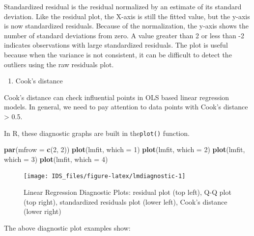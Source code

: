 \documentclass[12pt,]{krantz}
\makeatletter
\newenvironment{Shaded}{\begin{snugshade}}{\end{snugshade}}
\newcommand{\DataTypeTok}[1]{\textcolor[rgb]{0.27,0.27,0.27}{#1}}
\newcommand{\DecValTok}[1]{\textcolor[rgb]{0.06,0.06,0.06}{#1}}
\newcommand{\KeywordTok}[1]{\textcolor[rgb]{0.27,0.27,0.27}{\textbf{#1}}}
\newcommand{\NormalTok}[1]{#1}
\providecommand{\tightlist}{%
  \setlength{\itemsep}{0pt}\setlength{\parskip}{0pt}}
\newenvironment{kframe}{%
\medskip{}
\setlength{\fboxsep}{.8em}
 \def\at@end@of@kframe{}%
 \ifinner\ifhmode%
  \def\at@end@of@kframe{\end{minipage}}%
  \begin{minipage}{\columnwidth}%
 \fi\fi%
 \def\FrameCommand##1{\hskip\@totalleftmargin \hskip-\fboxsep
 \colorbox{shadecolor}{##1}\hskip-\fboxsep
     \hskip-\linewidth \hskip-\@totalleftmargin \hskip\columnwidth}%
 \MakeFramed {\advance\hsize-\width
   \@totalleftmargin\z@ \linewidth\hsize
   \@setminipage}}%
 {\par\unskip\endMakeFramed%
 \at@end@of@kframe}
\renewenvironment{Shaded}{\begin{kframe}}{\end{kframe}}
\makeatother
\begin{document}
Standardized residual is the residual normalized by an estimate of its standard deviation. Like the residual plot, the X-axis is still the fitted value, but the y-axis is now standardized residuals. Because of the normalization, the y-axis shows the number of standard deviations from zero. A value greater than 2 or less than -2 indicates observations with large standardized residuals. The plot is useful because when the variance is not consistent, it can be difficult to detect the outliers using the raw residuals plot.

\begin{enumerate}
\def\labelenumi{(\arabic{enumi})}
\setcounter{enumi}{3}
\tightlist
\item
  Cook's distance 
\end{enumerate}

Cook's distance can check influential points in OLS based linear regression models. In general, we need to pay attention to data points with Cook's distance \textgreater{} 0.5.

In R, these diagnostic graphs are built in the\texttt{plot()} function.

\begin{Shaded}
\begin{Highlighting}[]
\KeywordTok{par}\NormalTok{(}\DataTypeTok{mfrow =} \KeywordTok{c}\NormalTok{(}\DecValTok{2}\NormalTok{, }\DecValTok{2}\NormalTok{))}
\KeywordTok{plot}\NormalTok{(lmfit, }\DataTypeTok{which =} \DecValTok{1}\NormalTok{)}
\KeywordTok{plot}\NormalTok{(lmfit, }\DataTypeTok{which =} \DecValTok{2}\NormalTok{)}
\KeywordTok{plot}\NormalTok{(lmfit, }\DataTypeTok{which =} \DecValTok{3}\NormalTok{)}
\KeywordTok{plot}\NormalTok{(lmfit, }\DataTypeTok{which =} \DecValTok{4}\NormalTok{)}
\end{Highlighting}
\end{Shaded}

\begin{figure}

{\centering \texttt{[image: IDS\_files/figure-latex/lmdiagnostic-1]} 

}

\caption{Linear Regression Diagnostic Plots: residual plot (top left), Q-Q plot (top right), standardized residuals plot (lower left), Cook's distance (lower right)}\label{fig:lmdiagnostic}
\end{figure}

The above diagnostic plot examples show:
\end{document}
